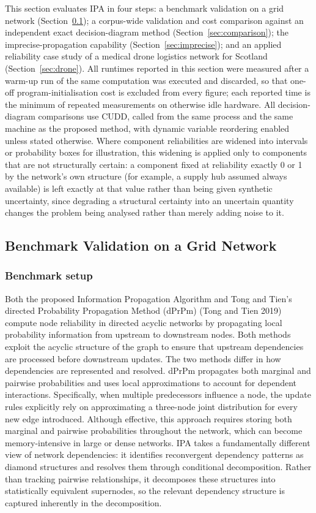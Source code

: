 \documentclass[preprint,12pt]{elsarticle}
\theoremstyle{definition}
\begin{document}
This section evaluates IPA in four steps: a benchmark validation on a grid network
(Section~\ref{sec:grid}); a corpus-wide validation and cost comparison against an independent exact
decision-diagram method (Section~\ref{sec:comparison}); the imprecise-propagation capability
(Section~\ref{sec:imprecise}); and an applied reliability case study of a medical drone logistics
network for Scotland (Section~\ref{sec:drone}). All runtimes reported in this section were measured
after a warm-up run of the same computation was executed and discarded, so that one-off
program-initialisation cost is excluded from every figure; each reported time is the minimum of repeated
measurements on otherwise idle hardware. All decision-diagram comparisons use CUDD, called from the same
process and the same machine as the proposed method, with dynamic variable reordering enabled unless
stated otherwise. Where component reliabilities are widened into intervals or probability boxes for
illustration, this widening is applied only to components that are not structurally certain: a component
fixed at reliability exactly 0 or 1 by the network's own structure (for example, a supply hub assumed
always available) is left exactly at that value rather than being given synthetic uncertainty, since
degrading a structural certainty into an uncertain quantity changes the problem being analysed rather
than merely adding noise to it.

\subsection{Benchmark Validation on a Grid Network}\label{sec:grid}

\subsubsection{Benchmark setup}

Both the proposed Information Propagation Algorithm and Tong and Tien's directed Probability Propagation
Method (dPrPm) (Tong and Tien 2019) compute node reliability in directed acyclic networks by propagating
local probability information from upstream to downstream nodes. Both methods exploit the acyclic
structure of the graph to ensure that upstream dependencies are processed before downstream updates. The
two methods differ in how dependencies are represented and resolved. dPrPm propagates both marginal and
pairwise probabilities and uses local approximations to account for dependent interactions.
Specifically, when multiple predecessors influence a node, the update rules explicitly rely on
approximating a three-node joint distribution for every new edge introduced. Although effective, this
approach requires storing both marginal and pairwise probabilities throughout the network, which can
become memory-intensive in large or dense networks. IPA takes a fundamentally different view of network
dependencies: it identifies reconvergent dependency patterns as diamond structures and resolves them
through conditional decomposition. Rather than tracking pairwise relationships, it decomposes these
structures into statistically equivalent supernodes, so the relevant dependency structure is captured
inherently in the decomposition.
\end{document}
